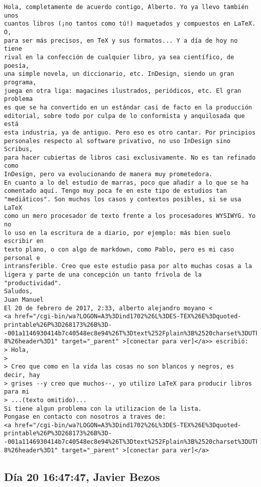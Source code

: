\documentclass[a4paper,10pt]{article}
\begin{document}
\begin{lstlisting}
Hola, completamente de acuerdo contigo, Alberto. Yo ya llevo también unos
cuantos libros (¡no tantos como tú!) maquetados y compuestos en LaTeX. O,
para ser más precisos, en TeX y sus formatos... Y a día de hoy no tiene
rival en la confección de cualquier libro, ya sea científico, de poesía,
una simple novela, un diccionario, etc. InDesign, siendo un gran programa,
juega en otra liga: magacines ilustrados, periódicos, etc. El gran problema
es que se ha convertido en un estándar casi de facto en la producción
editorial, sobre todo por culpa de lo conformista y anquilosada que está
esta industria, ya de antiguo. Pero eso es otro cantar. Por principios
personales respecto al software privativo, no uso InDesign sino Scribus,
para hacer cubiertas de libros casi exclusivamente. No es tan refinado como
InDesign, pero va evolucionando de manera muy prometedora.
En cuanto a lo del estudio de marras, poco que añadir a lo que se ha
comentado aquí. Tengo muy poca fe en este tipo de estudios tan
"mediáticos". Son muchos los casos y contextos posibles, si se usa LaTeX
como un mero procesador de texto frente a los procesadores WYSIWYG. Yo no
lo uso en la escritura de a diario, por ejemplo: más bien suelo escribir en
texto plano, o con algo de markdown, como Pablo, pero es mi caso personal e
intransferible. Creo que este estudio pasa por alto muchas cosas a la
ligera y parte de una concepción un tanto frívola de la "productividad".
Saludos,
Juan Manuel
El 20 de febrero de 2017, 2:33, alberto alejandro moyano <
<a href="/cgi-bin/wa?LOGON=A3%3Dind1702%26L%3DES-TEX%26E%3Dquoted-printable%26P%3D268173%26B%3D--001a1146930414b7c40548ec8e94%26T%3Dtext%252Fplain%3B%2520charset%3DUTF-8%26header%3D1" target="_parent" >[conectar para ver]</a>> escribió:
> Hola,
>
> Creo que como en la vida las cosas no son blancos y negros, es decir, hay
> grises --y creo que muchos--, yo utilizo LaTeX para producir libros para mi
> ...(texto omitido)...
Si tiene algun problema con la utilizacion de la lista.
Pongase en contacto con nosotros a traves de:
<a href="/cgi-bin/wa?LOGON=A3%3Dind1702%26L%3DES-TEX%26E%3Dquoted-printable%26P%3D268173%26B%3D--001a1146930414b7c40548ec8e94%26T%3Dtext%252Fplain%3B%2520charset%3DUTF-8%26header%3D1" target="_parent" >[conectar para ver]</a>

\end{lstlisting}

\subsection{Día 20 16:47:47, Javier Bezos}
\end{document}
